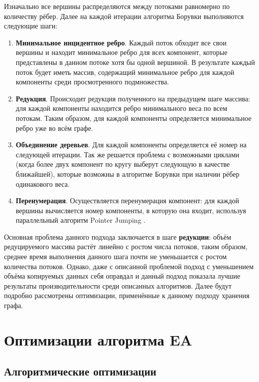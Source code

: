 \documentclass[a4paper,12pt]{extarticle}
\let\stdsection\section
\renewcommand\section{
    \newpage
    \stdsection
}
\begin{document}
Изначально все вершины распределяются между потоками равномерно по количеству рёбер. Далее на каждой итерации алгоритма Борувки выполняются следующие шаги:

\begin{enumerate}
    \item \textbf{Минимальное инцидентное ребро}.
		Каждый поток обходит все свои вершины и находит минимальное ребро для всех компонент, которые представлены в данном потоке хотя бы одной вершиной.
        В результате каждый поток будет иметь массив, содержащий минимальное ребро для каждой компоненты среди просмотренного подмножества.
    \item \textbf{Редукция}.
          Происходит редукция полученного на предыдущем шаге массива: для каждой компоненты находится ребро минимального веса по всем потокам. 
          Таким образом, для каждой компоненты определяется минимальное ребро уже во всём графе.
    \item \textbf{Объединение деревьев}.
          Для каждой компоненты определяется её номер на следующей итерации.
          Так же решается проблема с возможными циклами (когда более двух компонент по кругу выберут следующую в качестве ближайшей), которые возможны в алгоритме Борувки при наличии рёбер одинакового веса.
    \item \textbf{Перенумерация}.
          Осуществляется перенумерация компонент: для каждой вершины вычисляется номер компоненты, в которую она входит, используя параллельный алгоритм Pointer Jumping \cite{pointer-jumping}.
\end{enumerate}

Основная проблема данного подхода заключается в шаге \textbf{редукции}: объём редуцируемого массива растёт линейно с ростом числа потоков, таким образом, среднее время выполнения данного шага почти не уменьшается с ростом количества потоков.
Однако, даже с описанной проблемой подход с уменьшением объёма копируемых данных себя оправдал и данный подход показала лучшие результаты производительности среди описанных алгоритмов.
Далее будут подробно рассмотрены оптимизации, применённые к данному подходу хранения графа.

\section{Оптимизации алгоритма EA}
\label{sec:eaopt}

\subsection{Алгоритмические оптимизации}
\label{subsec:optAlgo}
\end{document}
